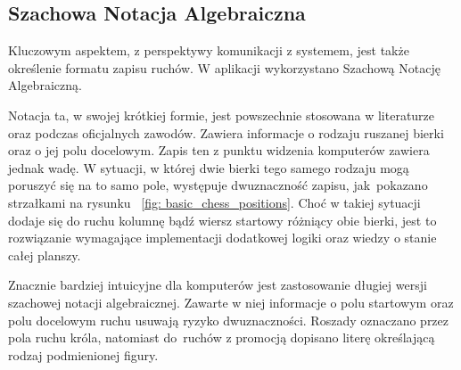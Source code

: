 \subsection{Szachowa Notacja Algebraiczna}
\label{subsec:notacja-algebraiczna}

Kluczowym aspektem, z perspektywy komunikacji z systemem, jest także określenie formatu zapisu ruchów.
W aplikacji wykorzystano Szachową Notację Algebraiczną.

Notacja ta, w swojej krótkiej formie, jest powszechnie stosowana w literaturze oraz podczas oficjalnych zawodów.
Zawiera informacje o rodzaju ruszanej bierki oraz o jej polu docelowym.
Zapis ten z punktu widzenia komputerów zawiera jednak wadę.
W sytuacji, w której dwie bierki tego samego rodzaju mogą poruszyć się na to samo pole, występuje dwuznaczność zapisu, jak~pokazano strzałkami na rysunku ~\ref{fig: basic_chess_positions}.
Choć w takiej sytuacji dodaje się do ruchu kolumnę bądź wiersz startowy różniący obie bierki, jest to rozwiązanie wymagające implementacji dodatkowej logiki oraz wiedzy o stanie całej planszy.

Znacznie bardziej intuicyjne dla komputerów jest zastosowanie długiej wersji szachowej notacji algebraicznej.
Zawarte w niej informacje o polu startowym oraz polu docelowym ruchu usuwają ryzyko dwuznaczności.
Roszady oznaczano przez pola ruchu króla, natomiast do~ruchów z promocją dopisano literę określającą rodzaj podmienionej figury.

